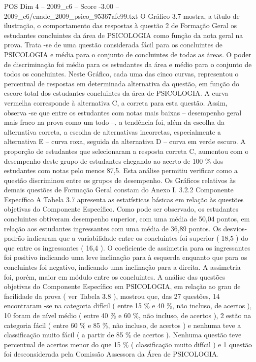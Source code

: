 \begin{textsample}{POS Dim 4 – 2009\_c6 – Score -3.00 – 2009\_c6/enade\_2009\_psico\_95367afe99.txt}
O Gráfico 3.7 mostra, a título de ilustração, o comportamento das respostas à questão 2 de Formação Geral os estudantes concluintes da área de PSICOLOGIA como função da nota geral na prova.
Trata -se de uma questão considerada fácil para os concluintes de PSICOLOGIA e média para o conjunto de concluintes de todas as áreas.
O poder de discriminação foi médio para os estudantes da área e médio para o conjunto de todos os concluintes.
Neste Gráfico, cada uma das cinco curvas, representou o percentual de respostas em determinada alternativa da questão, em função do escore total dos estudantes concluintes da área de PSICOLOGIA.
A curva vermelha corresponde à alternativa C, a correta para esta questão.
Assim, observa -se que entre os estudantes com notas mais baixas – desempenho geral mais fraco na prova como um todo –, a tendência foi, além da escolha da alternativa correta, a escolha de alternativas incorretas, especialmente a alternativa E – curva roxa, seguida da alternativa D – curva em verde escuro.
A proporção de estudantes que selecionaram a resposta correta C, aumentou com o desempenho deste grupo de estudantes chegando ao acerto de 100 \% dos estudantes com notas pelo menos 87,5.
Esta análise permitiu verificar como a questão discriminou entre os grupos de desempenho.
Os Gráficos relativos às demais questões de Formação Geral constam do Anexo I. 3.2.2 Componente Específico A Tabela 3.7 apresenta as estatísticas básicas em relação às questões objetivas do Componente Específico.
Como pode ser observado, os estudantes concluintes obtiveram desempenho superior, com uma média de 50,04 pontos, em relação aos estudantes ingressantes com uma média de 36,89 pontos.
Os desvios-padrão indicaram que a variabilidade entre os concluintes foi superior ( 18,5 ) do que entre os ingressantes ( 16,4 ).
O coeficiente de assimetria para os ingressantes foi positivo indicando uma leve inclinação para à esquerda enquanto que para os concluintes foi negativo, indicando uma inclinação para a direita.
A assimetria foi, porém, maior em módulo entre os concluintes.
A análise das questões objetivas do Componente Específico em PSICOLOGIA, em relação ao grau de facilidade da prova ( ver Tabela 3.8 ), mostrou que, das 27 questões, 14 encontraram -se na categoria difícil ( entre 15 \% e 40 \%, não incluso, de acertos ), 10 foram de nível médio ( entre 40 \% e 60 \%, não incluso, de acertos ), 2 estão na categoria fácil ( entre 60 \% e 85 \%, não incluso, de acertos ) e nenhuma teve a classificação muito fácil ( a partir de 85 \% de acertos ).
Nenhuma questão teve percentual de acertos menor do que 15 \% ( classificação muito difícil ) e 1 questão foi desconsiderada pela Comissão Assessora da Área de PSICOLOGIA.

\end{textsample}
